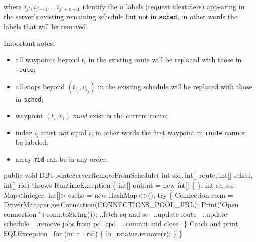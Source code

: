 \documentclass{article}
\def\nwendcode{\endtrivlist \endgroup}      %
\theoremstyle{definition}                   %
\begin{document}
\noindent where $i_{j'},i_{j'+1},...i_{j'+n-1}$ identify the $n$ labels
(request identifiers) appearing in the server's existing remaining
schedule but not in ${\tt{}sched}$, in other words the labels that will be removed.

Important notes:
\begin{itemize}
\item all waypoints beyond $t_i$ in the existing route will be replaced with
those in {\tt{}route};
\item all stops beyond $(t_{i_j},v_{i_j})$ in the existing schedule will be
replaced with those in {\tt{}sched};
\item waypoint $(t_i,v_i)$ \emph{must} exist in the current route;
\item index $i_j$ must \emph{not} equal $i$; in other words the first waypoint
in {\tt{}route} cannot be labeled;
\item array {\tt{}rid} can be in any order.
\end{itemize}
\nwenddocs{}\endmoddef{}
public void DBUpdateServerRemoveFromSchedule(
    int sid, int[] route, int[] sched, int[] rid)
throws RuntimeException \{
  int[] output = new int[] \{ \};
  int se, sq;
  Map<Integer, int[]> cache = new HashMap<>();
  try \{
    Connection conn = DriverManager.getConnection(CONNECTIONS_POOL_URL);
    Print("Open connection "+conn.toString());
    \LA{}..fetch \code{}sq\edoc{} and \code{}se\edoc{}~{\nwtagstyle{}}\RA{}
    \LA{}..update route~{\nwtagstyle{}}\RA{}
    \LA{}..update schedule~{\nwtagstyle{}}\RA{}
    \LA{}..remove jobs from pd, cpd~{\nwtagstyle{}}\RA{}
    \LA{}..commit and close~{\nwtagstyle{}}\RA{}
  \}
  \LA{}Catch and print \code{}SQLException\edoc{}~{\nwtagstyle{}}\RA{}
  for (int r : rid) \{
    lu_rstatus.remove(r);
  \}
\}
\eatline
{}\nwendcode{}\endmoddef{}
\end{document}
